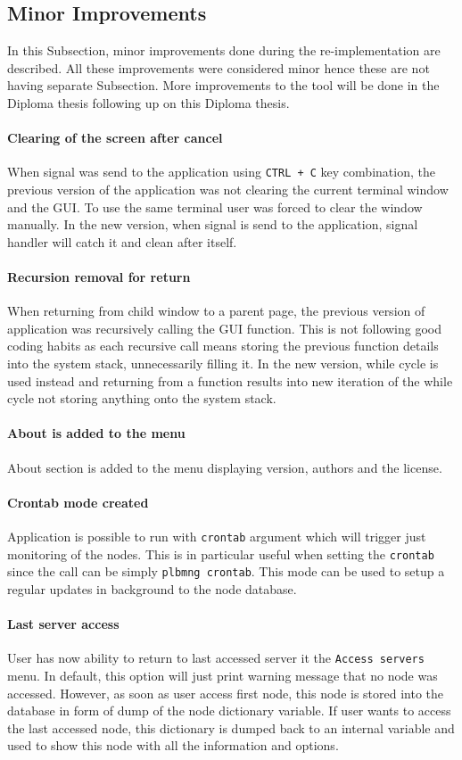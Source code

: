{{{{{{\subsection{Minor Improvements}
In this Subsection, minor improvements done during the re-implementation are described. All these improvements were considered minor hence these are not having separate Subsection. More improvements to the tool will be done in the Diploma thesis following up on this Diploma thesis.
\paragraph{Clearing of the screen after cancel}
When signal was send to the application using \texttt{CTRL + C} key combination, the previous version of the application was not clearing the current terminal window and the GUI. To use the same terminal user was forced to clear the window manually. In the new version, when signal is send to the application, signal handler will catch it and clean after itself.
\paragraph{Recursion removal for return}
When returning from child window to a parent page, the previous version of application was recursively calling the GUI function. This is not following good coding habits as each recursive call means storing the previous function details into the system stack, unnecessarily filling it. In the new version, while cycle is used instead and returning from a function results into new iteration of the while cycle not storing anything onto the system stack. 
\paragraph{About is added to the menu}
About section is added to the menu displaying version, authors and the license.
\paragraph{Crontab mode created}
Application is possible to run with \texttt{crontab} argument which will trigger just monitoring of the nodes. This is in particular useful when setting the \texttt{crontab} since the call can be simply \texttt{plbmng crontab}. This mode can be used to setup a regular updates in background to the node database.
\paragraph{Last server access}
User has now ability to return to last accessed server it the \texttt{Access servers} menu. In default, this option will just print warning message that no node was accessed. However, as soon as user access first node, this node is stored into the database in form of dump of the node dictionary variable. If user wants to access the last accessed node, this dictionary is dumped back to an internal variable and used to show this node with all the information and options.
}}}}}}
